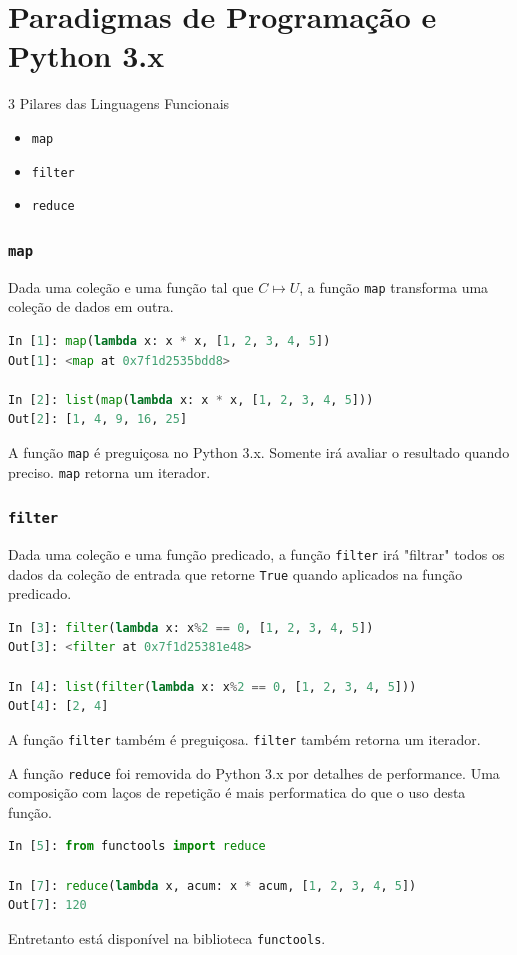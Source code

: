 \documentclass[aspectratio=169]{beamer}
\begin{document}

\section{Paradigmas de Programação e Python 3.x}

\begin{frame}{3 Pilares das Linguagens Funcionais}

    \begin{itemize}
        \item \texttt{map}
        \item \texttt{filter}
        \item \texttt{reduce}
    \end{itemize}

\end{frame}

\begin{frame}[fragile]
    \frametitle{\texttt{map}}
    Dada uma coleção e uma função tal que $C \mapsto U$, a função \texttt{map}
transforma uma coleção de dados em outra.
    \begin{lstlisting}[language=python]
In [1]: map(lambda x: x * x, [1, 2, 3, 4, 5])
Out[1]: <map at 0x7f1d2535bdd8>

In [2]: list(map(lambda x: x * x, [1, 2, 3, 4, 5]))
Out[2]: [1, 4, 9, 16, 25]
    \end{lstlisting}
    A função \texttt{map} é preguiçosa no Python 3.x. Somente irá avaliar o
resultado quando preciso. \texttt{map} retorna um iterador.
\end{frame}

\begin{frame}[fragile]
    \frametitle{\texttt{filter}}
    Dada uma coleção e uma função predicado, a função \texttt{filter} irá "filtrar"
todos os dados da coleção de entrada que retorne \texttt{True} quando aplicados na
função predicado.
    \begin{lstlisting}[language=python]
In [3]: filter(lambda x: x%2 == 0, [1, 2, 3, 4, 5])
Out[3]: <filter at 0x7f1d25381e48>

In [4]: list(filter(lambda x: x%2 == 0, [1, 2, 3, 4, 5]))
Out[4]: [2, 4]
    \end{lstlisting}
    A função \texttt{filter} também é preguiçosa. \texttt{filter} também retorna um
iterador.
\end{frame}

\begin{frame}[fragile]
    A função \texttt{reduce} foi removida do Python 3.x por detalhes de performance.
Uma composição com laços de repetição é mais performatica do que o uso desta função.
    \begin{lstlisting}[language=python]
In [5]: from functools import reduce

In [7]: reduce(lambda x, acum: x * acum, [1, 2, 3, 4, 5])
Out[7]: 120
    \end{lstlisting}
    Entretanto está disponível na biblioteca \texttt{functools}.
\end{frame}
\end{document}
